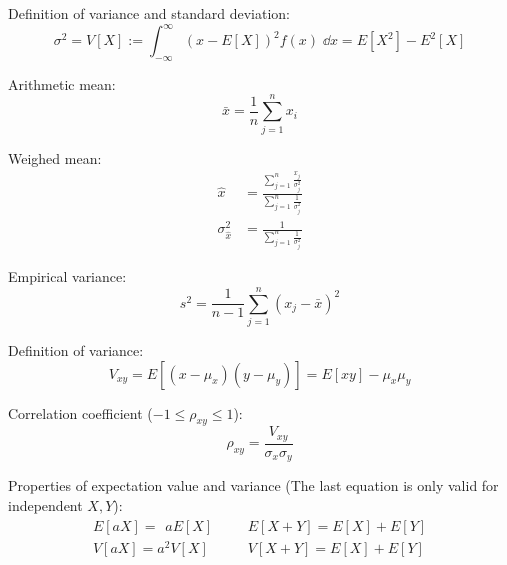 			\noindent
			Definition of variance and standard deviation:
			\begin{equation}
				\sigma^2 = V\left[ X \right] := \int_{-\infty}^{\infty} (x-E\left[X\right])^2f(x)\;\dd x = E\left[X^2\right]-E^2\left[X\right]
			\end{equation}

			\noindent
			Arithmetic mean:
			\begin{equation}
				\bar{x}=\frac{1}{n}\sum_{j=1}^n x_i
			\end{equation}

			\noindent
			Weighed mean:
			\begin{equation}
				\begin{aligned}
					\hat{x} &= \frac{\sum_{j=1}^n \frac{x_j}{\sigma_j^2}}{\sum_{j=1}^n \frac{1}{\sigma_j^2}} \\
					\sigma_{\hat{x}}^2 &= \frac{1}{\sum_{j=1}^n \frac{1}{\sigma_j^2}}
				\end{aligned}
			\end{equation}

			\noindent
			Empirical variance:
			\begin{equation}
				s^2 = \frac{1}{n-1}\sum_{j=1}^n (x_j-\bar{x})^2
			\end{equation}

			\noindent
			Definition of variance:
			\begin{equation}
				V_{xy} = E\left[(x-\mu_x)(y-\mu_y)\right] = E\left[xy\right]-\mu_x\mu_y
			\end{equation}

			\noindent
			Correlation coefficient ($-1\le\rho_{xy}\le 1$):
			\begin{equation}
				\rho_{xy} = \frac{V_{xy}}{\sigma_x\sigma_y}
			\end{equation}

			\noindent
			Properties of expectation value and variance (The last equation is only valid for independent $X, Y$):
			\begin{equation}
				\begin{array}{rl}
					E\left[aX\right] = \phantom{^2}a E\left[X\right]
					&\hspace{20pt}
					E\left[X+Y\right] = E\left[X\right] + E\left[Y\right]
					\\
					V\left[aX\right] = a^2 V\left[X\right]
					&\hspace{20pt}
					V\left[X+Y\right] = E\left[X\right] + E\left[Y\right]
					\\
				\end{array}
			\end{equation}

